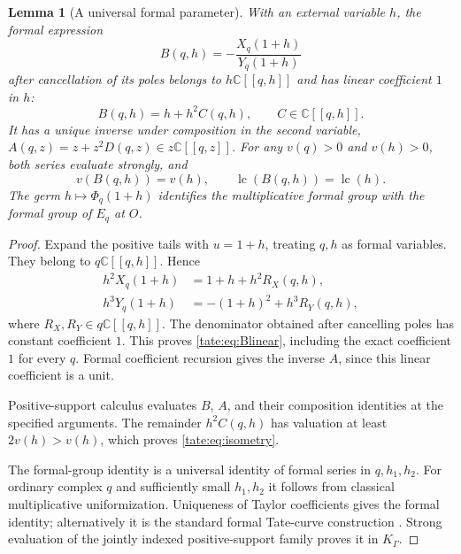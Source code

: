 \documentclass[11pt,letterpaper]{article}
\newtheorem{lemma}[lemma]{Lemma}
\theoremstyle{definition}
\newcommand{\C}{\mathbb C}
\newcommand{\lc}{\operatorname{lc}}
\begin{document}
\begin{lemma}[A universal formal parameter]\label{tate:lem:formal-identity}
With an external variable $h$, the formal expression
\begin{equation}
 B(q,h)=-\frac{X_q(1+h)}{Y_q(1+h)}\label{tate:eq:B}
\end{equation}
after cancellation of its poles belongs to $h\C[[q,h]]$ and has
linear coefficient $1$ in $h$:
\begin{equation}
 B(q,h)=h+h^2 C(q,h),\qquad C\in\C[[q,h]].\label{tate:eq:Blinear}
\end{equation}
It has a unique inverse under composition in the second variable,
$A(q,z)=z+z^2D(q,z)\in z\C[[q,z]]$.
For any $v(q)>0$ and $v(h)>0$, both series evaluate strongly, and
\begin{equation}
 v(B(q,h))=v(h),\qquad \lc(B(q,h))=\lc(h).\label{tate:eq:isometry}
\end{equation}
The germ $h\mapsto\Phi_q(1+h)$ identifies the multiplicative formal
group with the formal group of $E_q$ at $O$.
\end{lemma}

\begin{proof}
Expand the positive tails with $u=1+h$, treating $q,h$ as formal
variables. They belong to $q\C[[q,h]]$. Hence
\begin{align*}
 h^2X_q(1+h)&=1+h+h^2R_X(q,h),\\
 h^3Y_q(1+h)&=-(1+h)^2+h^3R_Y(q,h),
\end{align*}
where $R_X,R_Y\in q\C[[q,h]]$. The denominator obtained after cancelling
poles has constant coefficient $1$. This proves
\eqref{tate:eq:Blinear}, including the exact coefficient $1$ for every $q$.
Formal coefficient recursion gives the inverse $A$, since this linear
coefficient is a unit.

Positive-support calculus evaluates $B$, $A$, and their composition
identities at the specified arguments. The remainder $h^2 C(q,h)$ has
valuation at least $2v(h)>v(h)$, which proves \eqref{tate:eq:isometry}.

The formal-group identity is a universal identity of formal series in
$q,h_1,h_2$. For ordinary complex $q$ and sufficiently small $h_1,h_2$
it follows from classical multiplicative uniformization. Uniqueness of
Taylor coefficients gives the formal identity; alternatively it is the
standard formal Tate-curve construction \cite{Tate,Conrad}. Strong
evaluation of the jointly indexed positive-support family proves it in
$K_\Gamma$.
\end{proof}
\end{document}
